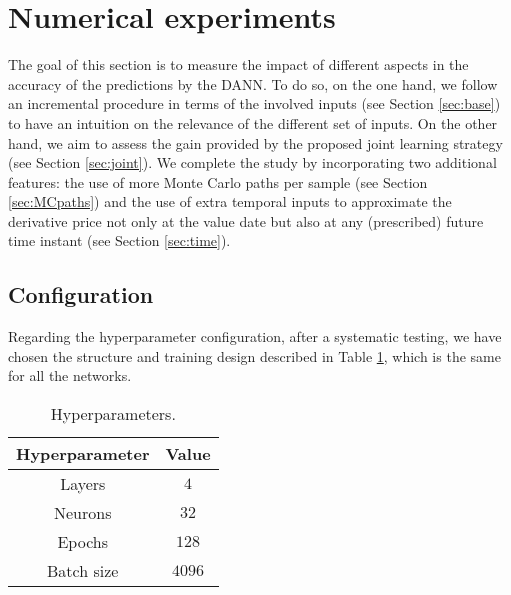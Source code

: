     
\section{Numerical experiments}\label{sec:results}

    The goal of this section is to measure the impact of different aspects in the accuracy of the predictions by the DANN. To do so, on the one hand, we follow an incremental procedure in terms of the involved inputs (see Section \ref{sec:base}) to have an intuition on the relevance of the different set of inputs. On the other hand, we aim to assess the gain provided by the proposed joint learning strategy (see Section \ref{sec:joint}). We complete the study by incorporating two additional features: the use of more Monte Carlo paths per sample (see Section \ref{sec:MCpaths}) and the use of extra temporal inputs to approximate the derivative price not only at the value date but also at any (prescribed) future time instant (see Section \ref{sec:time}).

    \subsection{Configuration}

        Regarding the hyperparameter configuration, after a systematic testing, we have chosen the structure and training design described in Table \ref{tab:hyperparameters}, which is the same for all the networks.
            \begin{table}[h!]
                \centering
                \begin{tabular}{c|c}
                    Hyperparameter & Value \\
                    \hline\hline
                    Layers & $4$ \\
                    Neurons & $32$ \\
                    Epochs & $128$ \\
                    Batch size & $4096$ \\
                    \hline
                \end{tabular}
                \caption{Hyperparameters.}
                \label{tab:hyperparameters}
            \end{table}

